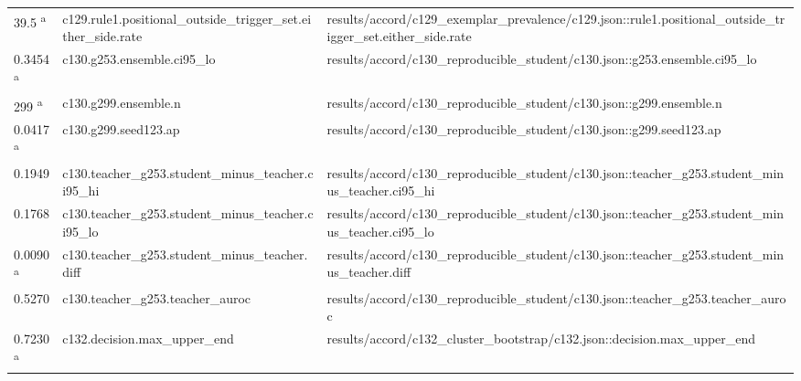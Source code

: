 \begin{longtable}{@{}p{0.7in}p{1.9in}p{2.6in}@{}}
39.5 \textsuperscript{a} & c129.\allowbreak{}rule1.\allowbreak{}positional\_outside\_trigger\_set.\allowbreak{}either\_side.\allowbreak{}rate & results/\allowbreak{}accord/\allowbreak{}c129\_exemplar\_prevalence/\allowbreak{}c129.\allowbreak{}json::rule1.\allowbreak{}positional\_outside\_trigger\_set.\allowbreak{}either\_side.\allowbreak{}rate\\
0.3454 \textsuperscript{a} & c130.\allowbreak{}g253.\allowbreak{}ensemble.\allowbreak{}ci95\_lo & results/\allowbreak{}accord/\allowbreak{}c130\_reproducible\_student/\allowbreak{}c130.\allowbreak{}json::g253.\allowbreak{}ensemble.\allowbreak{}ci95\_lo\\
299 \textsuperscript{a} & c130.\allowbreak{}g299.\allowbreak{}ensemble.\allowbreak{}n & results/\allowbreak{}accord/\allowbreak{}c130\_reproducible\_student/\allowbreak{}c130.\allowbreak{}json::g299.\allowbreak{}ensemble.\allowbreak{}n\\
0.0417 \textsuperscript{a} & c130.\allowbreak{}g299.\allowbreak{}seed123.\allowbreak{}ap & results/\allowbreak{}accord/\allowbreak{}c130\_reproducible\_student/\allowbreak{}c130.\allowbreak{}json::g299.\allowbreak{}seed123.\allowbreak{}ap\\
0.1949 & c130.\allowbreak{}teacher\_g253.\allowbreak{}student\_minus\_teacher.\allowbreak{}ci95\_hi & results/\allowbreak{}accord/\allowbreak{}c130\_reproducible\_student/\allowbreak{}c130.\allowbreak{}json::teacher\_g253.\allowbreak{}student\_minus\_teacher.\allowbreak{}ci95\_hi\\
0.1768 & c130.\allowbreak{}teacher\_g253.\allowbreak{}student\_minus\_teacher.\allowbreak{}ci95\_lo & results/\allowbreak{}accord/\allowbreak{}c130\_reproducible\_student/\allowbreak{}c130.\allowbreak{}json::teacher\_g253.\allowbreak{}student\_minus\_teacher.\allowbreak{}ci95\_lo\\
0.0090 \textsuperscript{a} & c130.\allowbreak{}teacher\_g253.\allowbreak{}student\_minus\_teacher.\allowbreak{}diff & results/\allowbreak{}accord/\allowbreak{}c130\_reproducible\_student/\allowbreak{}c130.\allowbreak{}json::teacher\_g253.\allowbreak{}student\_minus\_teacher.\allowbreak{}diff\\
0.5270 & c130.\allowbreak{}teacher\_g253.\allowbreak{}teacher\_auroc & results/\allowbreak{}accord/\allowbreak{}c130\_reproducible\_student/\allowbreak{}c130.\allowbreak{}json::teacher\_g253.\allowbreak{}teacher\_auroc\\
0.7230 \textsuperscript{a} & c132.\allowbreak{}decision.\allowbreak{}max\_upper\_end & results/\allowbreak{}accord/\allowbreak{}c132\_cluster\_bootstrap/\allowbreak{}c132.\allowbreak{}json::decision.\allowbreak{}max\_upper\_end\\

\end{longtable}

